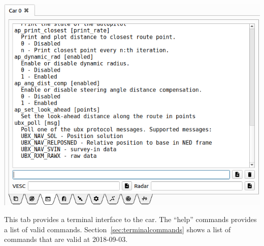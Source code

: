 \documentclass[12pt]{article} %
\begin{document}
\noindent\begin{minipage}{0.5\textwidth}
  \noindent \includegraphics[width=\textwidth]{./screens/Car_terminal.png}
\end{minipage}
\begin{minipage}{0.5\textwidth} %
   This tab provides a terminal interface to the car. The ``help'' commands provides a list
  of valid commands. Section~\ref{sec:terminalcommands} shows a list of commands that
  are valid at 2018-09-03. 
\end{minipage}


\end{document}
